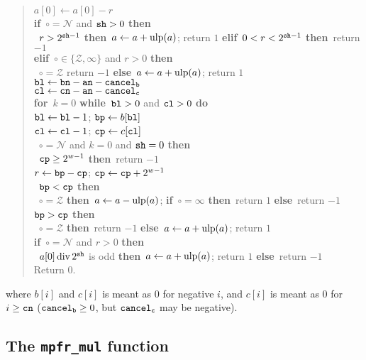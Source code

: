 \documentclass[12pt]{amsart}
\def\q{\hspace*{5mm}}
\def\ulp{{\rm ulp}}
\def\Z{{\mathcal Z}}
\def\N{{\mathcal N}}
\def\If{{\bf if}}
\def\then{{\bf then}}
\def\Else{{\bf else}}
\def\elif{{\bf elif}}
\def\for{{\bf for}}
\def\while{{\bf while}}
\begin{document}
\begin{quote}
        $a[0] \leftarrow a[0] - r$ \\
\If\ $\circ = \N$ and ${\tt sh} > 0$ \then \\
\q \If\ $r > 2^{{\tt sh}-1}$ \then\
        $a \leftarrow a + \ulp(a)$; return $1$
   \elif\ $0 < r < 2^{{\tt sh}-1}$ \then\ return $-1$ \\
\elif\ $\circ \in \{ \Z, \infty \}$ and $r > 0$ \then \\
\q \If\ $\circ = \Z$ return $-1$
   \Else\ $a \leftarrow a + \ulp(a)$; return $1$ \\
${\tt bl} \leftarrow {\tt bn} - {\tt an} - {\tt cancel_b}$ \\
${\tt cl} \leftarrow {\tt cn} - {\tt an} - {\tt cancel_c}$ \\
\for\ $k=0$ \while\ ${\tt bl} > 0$ and ${\tt cl} > 0$ {\bf do} \\
\q ${\tt bl} \leftarrow {\tt bl} - 1$; ${\tt bp} \leftarrow b[{\tt bl}]$ \\
\q ${\tt cl} \leftarrow {\tt cl} - 1$; ${\tt cp} \leftarrow c[{\tt cl}]$ \\
\q \If\ $\circ = \N$ and $k=0$ and ${\tt sh}=0$ \then \\
\q \q \If\ ${\tt cp} \ge 2^{w-1}$ \then\ return $-1$ \\
\q \q $r \leftarrow {\tt bp} - {\tt cp}$; \quad
        ${\tt cp} \leftarrow {\tt cp} + 2^{w-1}$ \\
\q \If\ ${\tt bp} < {\tt cp}$ \then \\
\q \q \If\ $\circ = \Z$ \then\ $a \leftarrow a - \ulp(a)$; \quad
      \If\ $\circ = \infty$ \then\ return $1$ \Else\ return $-1$
\q \If\ ${\tt bp} > {\tt cp}$ \then \\
\q \q \If\ $\circ = \Z$ \then\ return $-1$ \Else\
        $a \leftarrow a + \ulp(a)$; return $1$ \\
\If\ $\circ = \N$ and $r > 0$ \then \\
\q \If\ $a[0] \, {\rm div} \, 2^{\tt sh}$ is odd \then\
        $a \leftarrow a + \ulp(a)$; return $1$ \Else\ return $-1$ \\
Return $0$.
\end{quote}
where $b[i]$ and $c[i]$ is meant as $0$ for negative $i$,
and $c[i]$ is meant as $0$ for $i \ge {\tt cn}$
(${\tt cancel_b} \ge 0$, but ${\tt cancel_c}$ may be negative).

\subsection{The {\tt mpfr\_mul} function}
\end{document}
